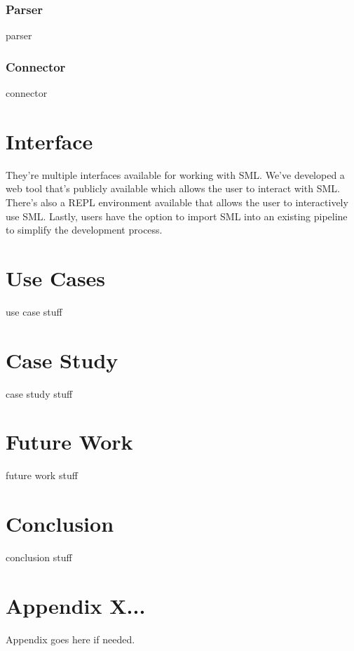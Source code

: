 \documentclass[jair,twoside,11pt,theapa]{article}
\begin{document}
\subsubsection{Parser}
parser

\subsubsection{Connector}
connector

\section{Interface}
\label{interface}

They're multiple interfaces available for working with SML. We've developed a web tool that's publicly available which allows the user to interact with SML. There's also a REPL environment available that allows the user to interactively use SML. Lastly, users have the option to import SML into an existing pipeline to simplify the development process.

\section{Use Cases}
\label{use-cases}

use case stuff

\section{Case Study}
\label{case-study}
case study stuff

\section{Future Work}
\label{future-work}

future work stuff

\section{Conclusion}
\label{conclusion}
conclusion stuff


\appendix
\section*{Appendix X...}

Appendix goes here if needed.

\vskip 0.2in


\end{document}
